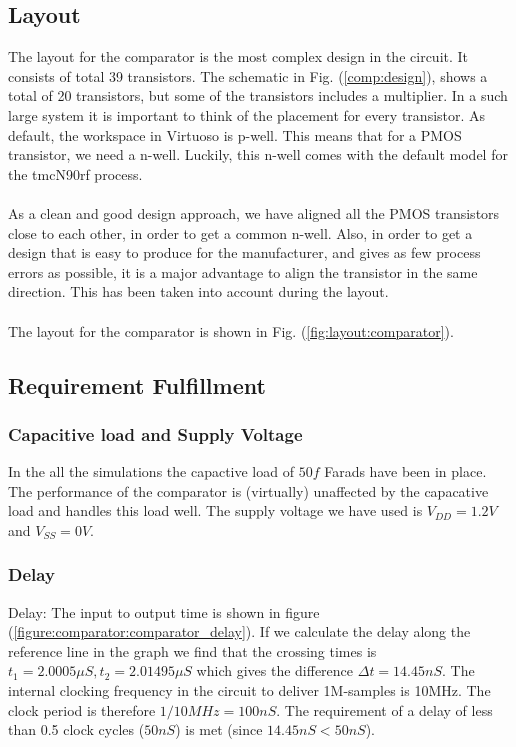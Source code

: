 \documentclass[english, 12pt, a4paper]{ifimaster}
\begin{document}
\subsection{Layout}
The layout for the comparator is the most complex design in the circuit. It consists 
of total 39 transistors. The schematic in Fig. (\ref{comp:design}), shows a total of 20 transistors, but some of the
transistors includes a multiplier. In a such large system it is important to think 
of the placement for every transistor. As default, the workspace in Virtuoso is p-well. 
This means that for a PMOS transistor, we need a n-well. Luckily, this n-well comes 
with the default model for the tmcN90rf process. \\
\\
As a clean and good design approach, we have aligned all the PMOS transistors close 
to each other, in order to get a common n-well. Also, in order to get a design that 
is easy to produce for the manufacturer, and gives as few process errors as 
possible, it is a major advantage to align the transistor in the same direction. 
This has been taken into account during the layout.\\
\\
The layout for the comparator is shown in Fig. (\ref{fig:layout:comparator}). 



\subsection{Requirement Fulfillment}
\subsubsection{Capacitive load and Supply Voltage}
In the all the simulations the capactive load of \(50 f\) Farads have been in place. The performance of the comparator is (virtually) unaffected by the capacative load and handles this load well.
The supply voltage we have used is \(V_{DD} = 1.2V\) and \(V_{SS} = 0V\).

\subsubsection{Delay}
Delay: The input to output time is shown in figure (\ref{figure:comparator:comparator_delay}). 
If we calculate the delay along the reference line in the graph we find that the crossing times is \( t_1 = 2.0005\mu S, t_2 = 2.01495\mu S \) which gives the difference \(\Delta t = 14.45nS \).
The internal clocking frequency in the circuit to deliver 1M-samples is 10MHz. The clock period is therefore \(1/10MHz = 100nS\). 
The requirement of a delay of less than 0.5 clock cycles (\(50nS\)) is met (since \(14.45nS < 50nS\)).
\end{document}
